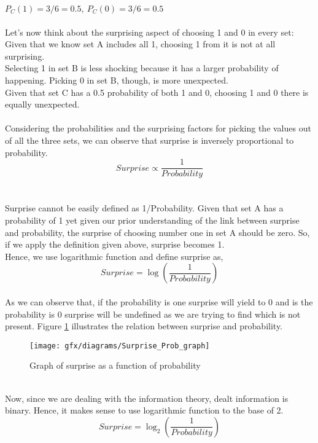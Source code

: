 $P_{C}(1) = 3/6 = 0.5,\ P_{C}(0) = 3/6 = 0.5$\\\\
Let's now think about the surprising aspect of choosing 1 and 0 in every set:\\
Given that we know set A includes all 1, choosing 1 from it is not at all surprising.\\
Selecting 1 in set B is less shocking because it has a larger probability of happening. Picking 0 in set B, though, is more unexpected.\\
Given that set C has a 0.5 probability of both 1 and 0, choosing 1 and 0 there is equally unexpected.\\\\
Considering the probabilities and the surprising factors for picking the values out of all the three sets, we can observe that surprise is inversely proportional to probability.
\begin{equation*}
Surprise \propto \frac{1}{Probability}
\end{equation*}\\\\
Surprise cannot be easily defined as 1/Probability. Given that set A has a probability of 1 yet given our prior understanding of the link between surprise and probability, the surprise of choosing number one in set A should be zero. So, if we apply the definition given above, surprise becomes 1.\\
Hence, we use logarithmic function and define surprise as,
\begin{equation*}
Surprise = \log\left(\frac{1}{Probability}\right)
\end{equation*}\\
As we can observe that, if the probability is one surprise will yield to 0 and is the probability is 0 surprise will be undefined as we are trying to find which is not present. Figure \ref{fig:2:1} illustrates the relation between surprise and probability.
\begin{figure}[htbp]
	\centering
	\texttt{[image: gfx/diagrams/Surprise\_Prob\_graph]}
	\caption{Graph of surprise as a function of probability}
	\label{fig:2:1}
\end{figure}\\
Now, since we are dealing with the information theory, dealt information is binary. Hence, it makes sense to use logarithmic function to the base of 2. 
\begin{equation}\label{eq:2:3}
Surprise = \log_{2}\left(\frac{1}{Probability}\right)
\end{equation}\\
